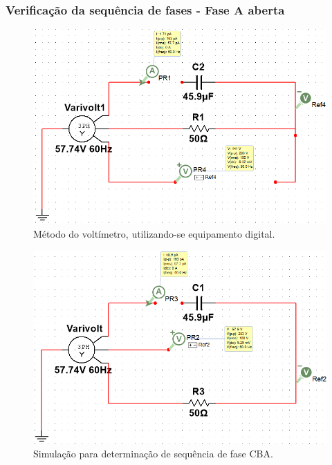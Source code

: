 \documentclass[a4paper,12pt,oneside,openany,table,xcdraw]{article}
\begin{document}
\subsubsection{Verificação da sequência de fases - Fase A aberta}
\begin{figure}[H]
\centering
\includegraphics[width=13cm]{m2-sim-abc}
\caption{Método do voltímetro, utilizando-se equipamento digital.}
\label{m2:sim:abc}
\end{figure}

\vspace{0.2cm}
\begin{figure}[H]
\centering
\includegraphics[width=13cm]{m2-sim-cba}
\caption{Simulação para determinação de sequência de fase CBA.}
\label{m2:sim:cba}
\end{figure}
\end{document}
